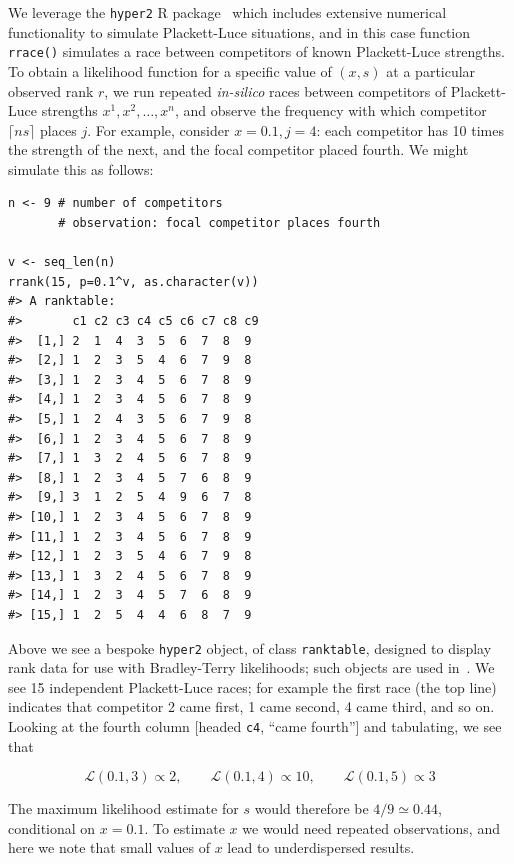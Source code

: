 \documentclass[article]{ajs}  %
\begin{document}
We leverage the {\tt hyper2} R package~\citep{hankin2017_rmd} which
includes extensive numerical functionality to simulate Plackett-Luce
situations, and in this case function {\tt rrace()} simulates a race
between competitors of known Plackett-Luce strengths.  To obtain a
likelihood function for a specific value of $(x,s)$ at a particular
observed rank $r$, we run repeated {\em in-silico} races between
competitors of Plackett-Luce strengths $x^1,x^2,\ldots,x^n$, and
observe the frequency with which competitor $\lceil ns\rceil$ places
$j$.  For example, consider $x=0.1, j=4$: each competitor has 10 times
the strength of the next, and the focal competitor placed fourth.  We
might simulate this as follows:

\label{rsession}
\begin{verbatim}
n <- 9 # number of competitors
       # observation: focal competitor places fourth

v <- seq_len(n)
rrank(15, p=0.1^v, as.character(v))
#> A ranktable:
#>       c1 c2 c3 c4 c5 c6 c7 c8 c9
#>  [1,] 2  1  4  3  5  6  7  8  9 
#>  [2,] 1  2  3  5  4  6  7  9  8 
#>  [3,] 1  2  3  4  5  6  7  8  9 
#>  [4,] 1  2  3  4  5  6  7  8  9 
#>  [5,] 1  2  4  3  5  6  7  9  8 
#>  [6,] 1  2  3  4  5  6  7  8  9 
#>  [7,] 1  3  2  4  5  6  7  8  9 
#>  [8,] 1  2  3  4  5  7  6  8  9 
#>  [9,] 3  1  2  5  4  9  6  7  8 
#> [10,] 1  2  3  4  5  6  7  8  9 
#> [11,] 1  2  3  4  5  6  7  8  9 
#> [12,] 1  2  3  5  4  6  7  9  8 
#> [13,] 1  3  2  4  5  6  7  8  9
#> [14,] 1  2  3  4  5  7  6  8  9 
#> [15,] 1  2  5  4  4  6  8  7  9 
\end{verbatim}

Above we see a bespoke {\tt hyper2} object, of class {\tt ranktable},
designed to display rank data for use with Bradley-Terry likelihoods;
such objects are used in~\citet{hankin2023_formula1points}.  We see 15
independent Plackett-Luce races; for example the first race (the top
line) indicates that competitor 2 came first, 1 came second, 4 came
third, and so on.  Looking at the fourth column [headed \verb+c4+,
  ``came fourth''] and tabulating, we see that

\begin{equation}
  \mathcal{L}(0.1,3)\propto 2,\qquad
  \mathcal{L}(0.1,4)\propto 10,\qquad
  \mathcal{L}(0.1,5)\propto 3
\end{equation}

The maximum likelihood estimate for $s$ would therefore be $4/9\simeq
0.44$, conditional on $x=0.1$.  To estimate $x$ we would need repeated
observations, and here we note that small values of $x$ lead to
underdispersed results.
\end{document}
